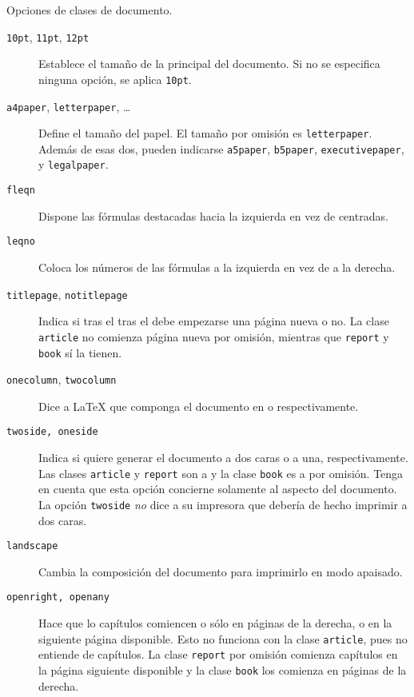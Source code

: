 \begin{table}[!bp]
\caption{Opciones de clases de documento.} \label{options}
\begin{lined}{\textwidth}
\begin{flushleft}
\begin{description}
  \item[\normalfont\texttt{10pt}, \texttt{11pt}, \texttt{12pt}] \quad Establece el tamaño de la principal \fontnomo{} del documento.  Si no se especifica ninguna opción, se aplica \texttt{10pt}.
  \item[\normalfont\texttt{a4paper}, \texttt{letterpaper}, \ldots] \quad Define el tamaño del papel.  El tamaño por omisión es \texttt{letterpaper}.  Además de esas dos, pueden indicarse \texttt{a5paper}, \texttt{b5paper}, \texttt{executivepaper}, y \texttt{legalpaper}.     
  \item[\normalfont\texttt{fleqn}] \quad Dispone las fórmulas destacadas  hacia la izquierda en vez de centradas.
  \item[\normalfont\texttt{leqno}] \quad Coloca los números de las  fórmulas a la izquierda en vez de a la derecha.
  \item[\normalfont\texttt{titlepage}, \texttt{notitlepage}] \quad Indica si tras el tras el  debe empezarse una página nueva o no.  La clase \texttt{article} no comienza página nueva por omisión, mientras que \texttt{report} y \texttt{book} sí la tienen. 
  \item[\normalfont\texttt{onecolumn}, \texttt{twocolumn}] \quad Dice a \LaTeX{} que componga el documento en  o  respectivamente.
  \item[\normalfont\texttt{twoside, oneside}] \quad Indica si quiere generar el documento a dos caras o a una, respectivamente.  Las clases \texttt{article} y \texttt{report} son a  y la clase \texttt{book} es a  por omisión.  Tenga en cuenta que esta opción concierne solamente al aspecto del documento.  La opción \texttt{twoside} \emph{no} dice a su impresora que debería de hecho imprimir a dos caras.
  \item[\normalfont\texttt{landscape}] \quad Cambia la composición del  documento para imprimirlo en modo apaisado.
  \item[\normalfont\texttt{openright, openany}] \quad Hace que lo capítulos comiencen o sólo en páginas de la derecha, o en la siguiente página disponible.  Esto no funciona con la clase \texttt{article}, pues no entiende de capítulos.  La clase \texttt{report} por omisión comienza capítulos en la página siguiente disponible y la clase \texttt{book} los comienza en páginas de la derecha.
\end{description}
\end{flushleft}
\end{lined}
\end{table}


